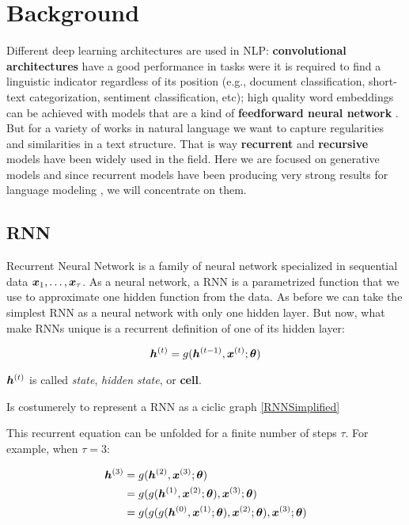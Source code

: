 \chapter{Background}
\label{ch:02-background}

Different deep learning architectures are used in NLP: \textbf{convolutional architectures} have a good performance in tasks were it is required to find a linguistic indicator regardless of its position (e.g., document classification, short-text categorization, sentiment classification, etc); high quality word embeddings can be achieved with models that are a kind of \textbf{feedforward neural network} \cite{Mikolov23}. But for a variety of works in natural language we want to capture regularities and similarities in a text structure. That is way \textbf{recurrent} and \textbf{recursive} models have been widely used in the field. Here we are focused on generative models and since recurrent models have been producing very strong results for language modeling \cite{goldberg15}, we will concentrate on them.

\section{RNN}
\label{sec:RNN}


Recurrent Neural Network is a family of neural network specialized in sequential data $\bm{x}_1, \dots, \bm{x}_\tau$. As a neural network, a RNN is a parametrized function that we use to approximate one hidden function from the data. As before we can take the simplest RNN as a neural network with only one hidden layer. But now, what make RNNs unique is a recurrent definition of one of its hidden layer:

\begin{equation}
\bm{h}^{(t)} = g(\bm{h}^{(t-1)}, \bm{x}^{(t)}; \bm{\theta})
\end{equation}

$\bm{h}^{(t)}$ is called \textit{state}, \textit{hidden state}, or \textbf{cell}.

Is costumerely to represent a RNN as a ciclic graph \ref{RNNSimplified}



\par This recurrent equation can be unfolded for a finite number of steps $\tau$. For example, when $\tau =3$:
\vspace{0.2cm}

\begin{align}
\bm{h}^{(3)}& = g(\bm{h}^{(2)}, \bm{x}^{(3)}; \bm{\theta})\\
 & = g(g(\bm{h}^{(1)}, \bm{x}^{(2)}; \bm{\theta}), \bm{x}^{(3)}; \bm{\theta})\\
 & = g(g(g(\bm{h}^{(0)}, \bm{x}^{(1)}; \bm{\theta}), \bm{x}^{(2)}; \bm{\theta}), \bm{x}^{(3)}; \bm{\theta})\\
\end{align}



